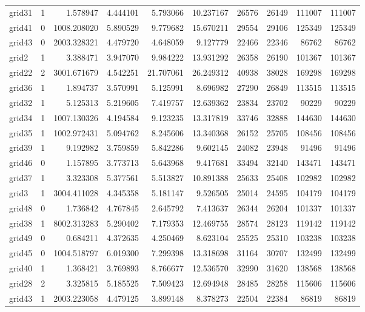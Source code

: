 \begin{longtable}{|l|r|r|r|r|r|r|r|r|r|}
grid31 & 1 & 1.578947 & 4.444101 & 5.793066 & 10.237167 & 26576 & 26149 & 111007 & 111007 \\
grid41 & 0 & 1008.208020 & 5.890529 & 9.779682 & 15.670211 & 29554 & 29106 & 125349 & 125349 \\
grid43 & 0 & 2003.328321 & 4.479720 & 4.648059 & 9.127779 & 22466 & 22346 & 86762 & 86762 \\
grid2 & 1 & 3.388471 & 3.947070 & 9.984222 & 13.931292 & 26358 & 26190 & 101367 & 101367 \\
grid22 & 2 & 3001.671679 & 4.542251 & 21.707061 & 26.249312 & 40938 & 38028 & 169298 & 169298 \\
grid36 & 1 & 1.894737 & 3.570991 & 5.125991 & 8.696982 & 27290 & 26849 & 113515 & 113515 \\
grid32 & 1 & 5.125313 & 5.219605 & 7.419757 & 12.639362 & 23834 & 23702 & 90229 & 90229 \\
grid34 & 1 & 1007.130326 & 4.194584 & 9.123235 & 13.317819 & 33746 & 32888 & 144630 & 144630 \\
grid35 & 1 & 1002.972431 & 5.094762 & 8.245606 & 13.340368 & 26152 & 25705 & 108456 & 108456 \\
grid39 & 1 & 9.192982 & 3.759859 & 5.842286 & 9.602145 & 24082 & 23948 & 91496 & 91496 \\
grid46 & 0 & 1.157895 & 3.773713 & 5.643968 & 9.417681 & 33494 & 32140 & 143471 & 143471 \\
grid37 & 1 & 3.323308 & 5.377561 & 5.513827 & 10.891388 & 25633 & 25408 & 102982 & 102982 \\
grid3 & 1 & 3004.411028 & 4.345358 & 5.181147 & 9.526505 & 25014 & 24595 & 104179 & 104179 \\
grid48 & 0 & 1.736842 & 4.767845 & 2.645792 & 7.413637 & 26344 & 26204 & 101337 & 101337 \\
grid38 & 1 & 8002.313283 & 5.290402 & 7.179353 & 12.469755 & 28574 & 28123 & 119142 & 119142 \\
grid49 & 0 & 0.684211 & 4.372635 & 4.250469 & 8.623104 & 25525 & 25310 & 103238 & 103238 \\
grid45 & 0 & 1004.518797 & 6.019300 & 7.299398 & 13.318698 & 31164 & 30707 & 132499 & 132499 \\
grid40 & 1 & 1.368421 & 3.769893 & 8.766677 & 12.536570 & 32990 & 31620 & 138568 & 138568 \\
grid28 & 2 & 3.325815 & 5.185525 & 7.509423 & 12.694948 & 28485 & 28258 & 115606 & 115606 \\
grid43 & 1 & 2003.223058 & 4.479125 & 3.899148 & 8.378273 & 22504 & 22384 & 86819 & 86819 \\

\end{longtable}
